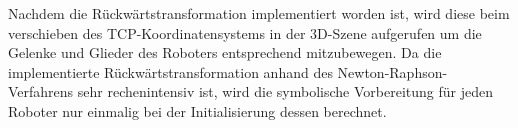Nachdem die Rückwärtstransformation implementiert worden ist,
wird diese beim verschieben des TCP-Koordinatensystems in der 3D-Szene aufgerufen um die Gelenke und Glieder des Roboters entsprechend mitzubewegen.
Da die implementierte Rückwärtstransformation anhand des Newton-Raphson-Verfahrens sehr rechenintensiv ist, wird die symbolische Vorbereitung für jeden
Roboter nur einmalig bei der Initialisierung dessen berechnet.














